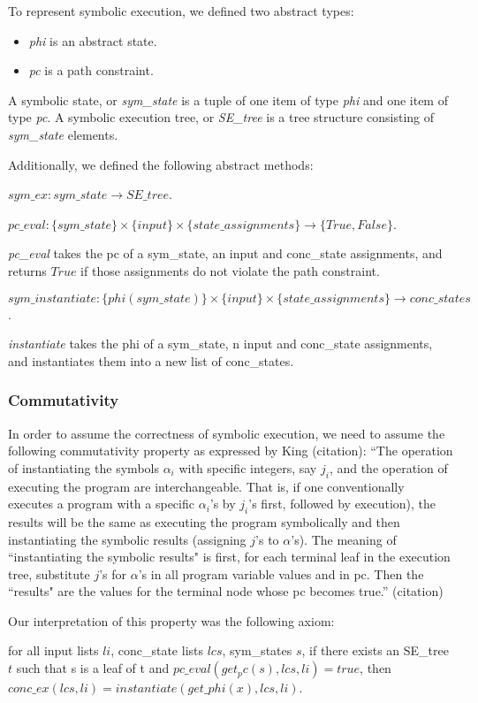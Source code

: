 To represent symbolic execution, we defined two abstract types:
\begin{itemize}
\item \emph{phi} is an abstract state.
\item \emph{pc} is a path constraint.
\end{itemize}

A symbolic state, or \emph{sym\_state} is a tuple of one item of type \emph{phi} and one item of type \emph{pc}.
A symbolic execution tree, or \emph{SE\_tree} is a tree structure consisting of \emph{sym\_state} elements. 


Additionally, we defined the following abstract methods:
\begin{define} 
$sym\_ex: sym\_state \rightarrow SE\_tree $.
\end{define}

\begin{define} [PC Evaluation]
$pc\_eval: \{sym\_state\} \times \{input\} \times \{state\_assignments\} \rightarrow \{True, False\} $.
\end{define}
\emph{pc\_eval} takes the pc of a sym\_state, an input and conc\_state assignments, and returns $True$ if those assignments do not violate the path constraint.

\begin{define} 
$sym\_instantiate: \{phi(sym\_state)\} \times \{input\} \times \{state\_assignments\} \rightarrow conc\_states $.
\end{define}
 \emph{instantiate} takes the phi of a sym\_state, n input and conc\_state assignments, and instantiates them into a new list of conc\_states.
 



\subsubsection{Commutativity}
In order to assume the correctness of symbolic execution, we need to assume the following commutativity property as expressed by King (citation):
``The operation of instantiating the symbols
{$\alpha_i$} with specific integers, say {$j_i$}, and the operation of
executing the program are interchangeable. That is, if
one conventionally executes a program with a specific
$\alpha_i$'s by
$j_i$'s first, followed by execution), the results will be the
same as executing the program symbolically and then
instantiating the symbolic results (assigning $j$'s to $\alpha$'s).
The meaning of ``instantiating the symbolic results" is
first, for each terminal leaf in the execution tree, substitute
$j$'s for $\alpha$'s in all program variable values and in
pc. Then the ``results" are the values for the terminal 
node whose pc becomes true.'' (citation)


Our interpretation of this property was the following axiom:
\begin{axiom}
for all input lists $li$, conc\_state lists $lcs$, sym\_states $s$,
if there exists an SE\_tree $t$ such that
s is a leaf of t and
$pc\_eval (get_pc(s), lcs, li) = true$,
then
$conc\_ex(lcs, li) = instantiate (get\_phi (x), lcs, li)$.
\end{axiom}

